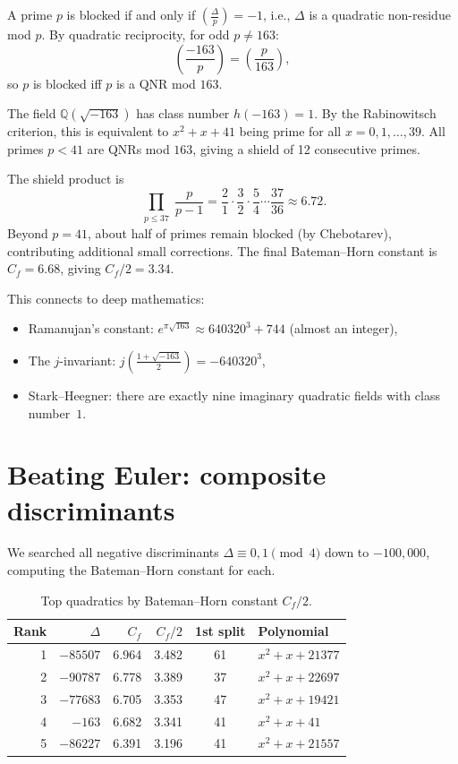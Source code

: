 \documentclass[11pt,a4paper]{article}
\theoremstyle{definition}
\theoremstyle{remark}
\newcommand{\Q}{\mathbb{Q}}
\begin{document}
A prime $p$ is blocked if and only if $\left(\frac{\Delta}{p}\right) = -1$, i.e., $\Delta$ is a quadratic non-residue mod $p$.
By quadratic reciprocity, for odd $p \neq 163$:
\[
\left(\frac{-163}{p}\right) = \left(\frac{p}{163}\right),
\]
so $p$ is blocked iff $p$ is a QNR mod $163$.

The field $\Q(\sqrt{-163})$ has class number $h(-163) = 1$.
By the Rabinowitsch criterion, this is equivalent to $x^2 + x + 41$ being prime for all $x = 0, 1, \ldots, 39$.
All primes $p < 41$ are QNRs mod $163$, giving a shield of 12 consecutive primes.

The shield product is
\[
\prod_{\substack{p \leq 37}} \frac{p}{p-1} = \frac{2}{1}\cdot\frac{3}{2}\cdot\frac{5}{4}\cdots\frac{37}{36} \approx 6.72.
\]
Beyond $p = 41$, about half of primes remain blocked (by Chebotarev), contributing additional small corrections.
The final Bateman--Horn constant is $C_f = 6.68$, giving $C_f/2 = 3.34$.

This connects to deep mathematics:
\begin{itemize}
\item Ramanujan's constant: $e^{\pi\sqrt{163}} \approx 640320^3 + 744$ (almost an integer),
\item The $j$-invariant: $j\!\left(\frac{1+\sqrt{-163}}{2}\right) = -640320^3$,
\item Stark--Heegner: there are exactly nine imaginary quadratic fields with class number~$1$.
\end{itemize}


\section{Beating Euler: composite discriminants}\label{sec:quadratic}

We searched all negative discriminants $\Delta \equiv 0, 1 \pmod{4}$ down to $-100{,}000$, computing the Bateman--Horn constant for each.

\begin{table}[ht]
\centering
\caption{Top quadratics by Bateman--Horn constant $C_f/2$.}
\label{tab:top-quad}
\medskip
\begin{tabular}{rrrrcl}
\toprule
Rank & $\Delta$ & $C_f$ & $C_f/2$ & 1st split & Polynomial \\
\midrule
1 & $-85507$ & 6.964 & 3.482 & 61 & $x^2+x+21377$ \\
2 & $-90787$ & 6.778 & 3.389 & 37 & $x^2+x+22697$ \\
3 & $-77683$ & 6.705 & 3.353 & 47 & $x^2+x+19421$ \\
4 & $-163$   & 6.682 & 3.341 & 41 & $x^2+x+41$ \\
5 & $-86227$ & 6.391 & 3.196 & 41 & $x^2+x+21557$ \\
\bottomrule
\end{tabular}
\end{table}
\end{document}
